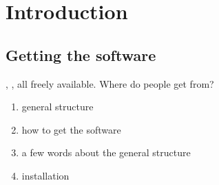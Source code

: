 

\section{Introduction}

\subsection{Getting the software}


\escript, \ESyS, all freely available.  Where do people get \finley from?



\begin{enumerate}
 \item general structure 
 \item how to get the software
 \item a few words about the general structure
\item installation
\end{enumerate}

